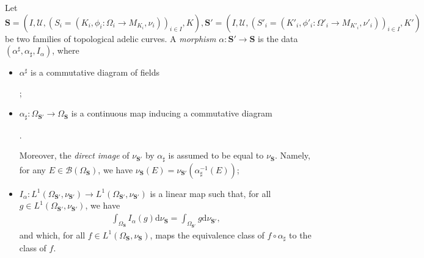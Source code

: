 \documentclass [11pt,reqno]{amsart}
\newcommand{\1}{\mathmybb{1}}
\def\cB{{\mathcal{B}}}
\def\cU{{\mathcal{U}}}
\def\diff{\mathrm{d}}
\begin{document}
\begin{definition}
\label{def:morphism_family_tac}
Let $\mathbf{S}=(I,\cU,(S_{i}=(K_{i},\phi_{i}:\Omega_{i}\to M_{K_{i}},\nu_{i}))_{i\in I},K),\mathbf{S'}=(I,\cU,(S'_{i}=(K'_{i},\phi'_{i}:\Omega'_{i}\to M_{K'_{i}},\nu'_{i}))_{i\in I},K')$ be two families of topological adelic curves. A \emph{morphism} $\alpha : \mathbf{S'} \rightarrow \mathbf{S}$ is the data $(\alpha^{\sharp},\alpha_{\sharp},I_\alpha)$, where
\begin{itemize}
	\item $\alpha^{\sharp}$ is a commutative diagram of fields 
	\begin{center}
;
	\end{center}
	\item $\alpha_{\sharp} : \Omega_{\mathbf{S'}} \rightarrow \Omega_{\mathbf{S}}$ is a continuous map inducing a commutative diagram 
\begin{center}
.
\end{center}
Moreover, the \emph{direct image} of $\nu_{\mathbf{S'}}$ by $\alpha_{\sharp}$ is assumed to be equal to $\nu_{\mathbf{S}}$. Namely, for any $E\in \cB(\Omega_{\mathbf{S}})$, we have $\nu_{\mathbf{S}}(E)=\nu_{\mathbf{S'}}(\alpha_{\sharp}^{-1}(E))$;
	\item $I_{\alpha} : L^1(\Omega_{\mathbf{S'}},\nu_{\mathbf{S'}}) \rightarrow L^1(\Omega_{\mathbf{S'}},\nu_{\mathbf{S'}})$ is a linear map such that, for all $g\in L^1(\Omega_{\mathbf{S'}},\nu_{\mathbf{S'}})$, we have
	\begin{align*}
	\int_{\Omega_{\mathbf{S}}} I_{\alpha}(g)\diff\nu_{\mathbf{S}} = \int_{\Omega_{\mathbf{S'}}} g\diff\nu_{\mathbf{S'}},
	\end{align*}
and which, for all $f \in L^{1}(\Omega_{\mathbf{S}},\nu_{\mathbf{S}})$, maps the equivalence class of $f\circ \alpha_{\sharp}$ to the class of $f$.
\end{itemize}
\end{definition}
\end{document}
